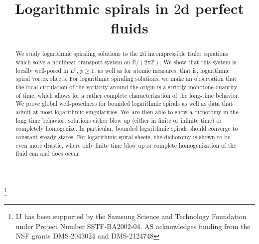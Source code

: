 \documentclass[JEP,XML,SOM,Unicode,NoFloatCountersInSection,published]{cedram}
\theoremstyle{plain}
\theoremstyle{definition}
\begin{document}
\title{Logarithmic spirals in \texorpdfstring{$2$}{2}d perfect fluids}

\author[\initial{I.-J.} \lastname{Jeong}]{ }
\address{Department of Mathematical Sciences and RIM, Seoul National University and School of Mathematics, Korea Institute for Advanced Study,\\
Seoul, Republic of Korea}

\author[\initial{A.} \middlename{R.} \lastname{Said}]{  }
\address{Department of Mathematics, Duke University,\\
120 Science Dr, Durham, NC 27710, USA}

\thanks{IJ has been supported by the Samsung Science and Technology Foundation under Project Number SSTF-BA2002-04. AS acknowledges funding from the NSF grants DMS-2043024 and DMS-2124748}

\begin{abstract}
We study logarithmic spiraling solutions to the 2d incompressible Euler equations which solve a nonlinear transport system on $\mathbb R/(2\pi\mathbb Z)$. We show that this system is locally well-posed in $L^p$, $p\geq 1$, as well as for atomic measures, that is, logarithmic spiral vortex sheets. For logarithmic spiraling solutions, we make an observation that the local circulation of the vorticity around the origin is a strictly monotone quantity of time, which allows for a rather complete characterization of the long-time behavior. We prove global well-posedness for bounded logarithmic spirals as well as data that admit at most logarithmic singularities. We~are then able to show a dichotomy in the long time behavior, solutions either blow up (either in finite or infinite time) or completely homogenize. In particular, bounded logarithmic spirals should converge to constant steady states. For logarithmic spiral sheets, the dichotomy is shown to be even more drastic, where only finite time blow up or complete homogenization of the fluid can and does occur.
\end{abstract}



\end{document}
